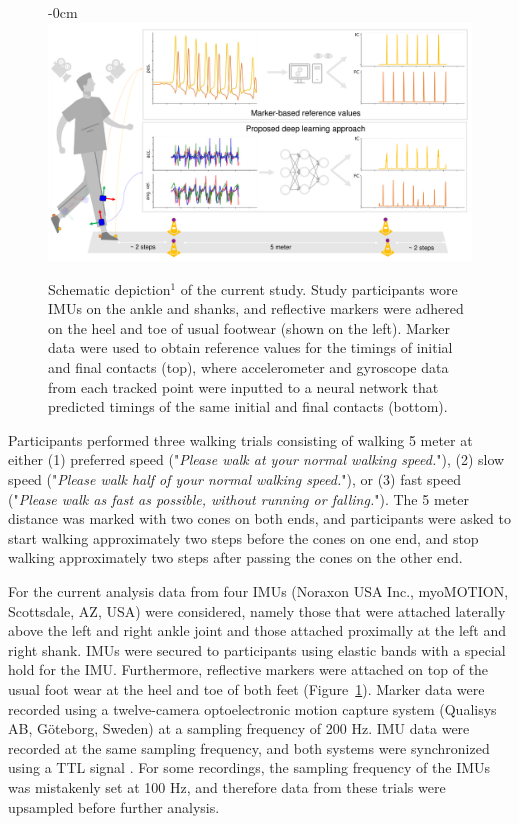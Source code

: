 \documentclass[sensors,article,submit,pdftex,moreauthors]{Definitions/mdpi}
\begin{document}
\begin{figure}[H]
	\begin{adjustwidth}{-\extralength}{0cm}
		\centering
		\includegraphics[width=13.5cm]{fig/methods_overall_workflow.pdf}
	\end{adjustwidth}
	\caption{Schematic depiction$^{1}$ of the current study. Study participants wore IMUs on the ankle and shanks, and reflective markers were adhered on the heel and toe of usual footwear (shown on the left). Marker data were used to obtain reference values for the timings of initial and final contacts (top), where accelerometer and gyroscope data from each tracked point were inputted to a neural network that predicted timings of the same initial and final contacts (bottom). \newline {} \label{fig:methods_marker_vs_imu}}
\end{figure}  

Participants performed three walking trials consisting of walking 5 meter at either (1) preferred speed ("\emph{Please walk at your normal walking speed.}"), (2) slow speed ("\emph{Please walk half of your normal walking speed.}"), or (3) fast speed ("\emph{Please walk as fast as possible, without running or falling.}"). The 5 meter distance was marked with two cones on both ends, and participants were asked to start walking approximately two steps before the cones on one end, and stop walking approximately two steps after passing the cones on the other end.

For the current analysis data from four IMUs (Noraxon USA Inc., myoMOTION, Scottsdale, AZ, USA) were considered, namely those that were attached laterally above the left and right ankle joint and those attached proximally at the left and right shank. IMUs were secured to participants using elastic bands with a special hold for the IMU. Furthermore, reflective markers were attached on top of the usual foot wear at the heel and toe of both feet (Figure~\ref{fig:methods_marker_vs_imu}). Marker data were recorded using a twelve-camera optoelectronic motion capture system (Qualisys AB, G\"{o}teborg, Sweden) at a sampling frequency of 200 Hz. IMU data were recorded at the same sampling frequency, and both systems were synchronized using a TTL signal \cite{Warmerdam2021}. For some recordings, the sampling frequency of the IMUs was mistakenly set at 100 Hz, and therefore data from these trials were upsampled before further analysis.
\end{document}
